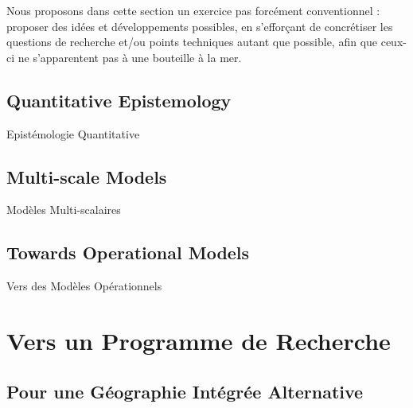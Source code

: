 Nous proposons dans cette section un exercice pas forcément conventionnel : proposer des idées et développements possibles, en s'efforçant de concrétiser les questions de recherche et/ou points techniques autant que possible, afin que ceux-ci ne s'apparentent pas à une bouteille à la mer.



\subsection{Quantitative Epistemology}{Epistémologie Quantitative}

%



\subsection{Multi-scale Models}{Modèles Multi-scalaires}





\subsection{Towards Operational Models}{Vers des Modèles Opérationnels}






\newpage


\section{Vers un Programme de Recherche}


\subsection{Pour une Géographie Intégrée Alternative}


